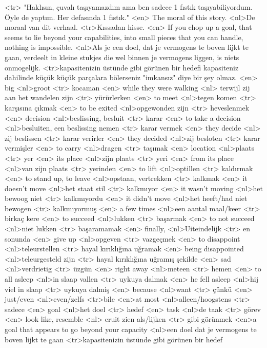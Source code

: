 <tr> "Haklısın, çuvalı taşıyamazdım ama ben sadece 1 fıstık taşıyabiliyordum. Öyle de yaptım. Her defasında 1 fıstık." 
<en> The moral of this story. 
<nl>De moraal van dit verhaal. 
<tr>Kıssadan hisse.
<en> If you chop up a goal, that seems to lie beyond your capabilities, into small pieces that you can handle, nothing is impossible.
<nl>Als je een doel, dat je vermogens te boven lijkt te gaan, verdeelt in kleine stukjes die wel binnen je vermogens liggen, is niets onmogelijk. 
<tr>kapasitenizin üstünde gibi görünen bir hedefi kapasiteniz dahilinde küçük küçük parçalara bölerseniz "imkansız" diye bir şey olmaz. 
<en> big 
<nl>groot 
<tr> kocaman 
<en> while they were walking 
<nl> terwijl zij aan het wandelen zijn 
<tr> yürürlerken
<en> to meet 
<nl>tegen komen 
<tr> karşısına çıkmak 
<en> to be exited 
<nl>opgewonden zijn 
<tr> heveslenmek 
<en> decision 
<nl>beslissing, besluit 
<tr>  karar 
<en> to take a decision 
<nl>besluiten, een beslissing nemen 
<tr> karar vermek 
<en> they decide 
<nl> zij beslissen 
<tr> karar verirler 
<en> they decided
<nl>zij besloten 
<tr> karar vermişler
<en> to carry 
<nl>dragen 
<tr> taşımak
<en> location 
<nl>plaats 
<tr> yer 
<en> its place 
<nl>zijn plaats 
<tr> yeri  
<en> from its place 
<nl>van zijn plaats 
<tr> yerinden 
<en> to lift 
<nl>optillen 
<tr> kaldırmak 
<en>  to stand up, to leave 
<nl>opstaan, vertrekken 
<tr> kalkmak 
<en> it doesn't move 
<nl>het staat stil 
<tr> kalkmıyor 
<en> it wasn't moving 
<nl>het bewoog niet 
<tr> kalkmıyordu   
<en> it didn't move 
<nl>het heeft/had niet bewogen 
<tr>  kalkmıyormuş 
<en> a few times  
<nl>een aantal maal/keer 
<tr> birka\c{c} kere 
<en> to succeed 
<nl>lukken 
<tr> başarmak 
<en> to not succeed 
<nl>niet  lukken 
<tr> başaramamak 
<en> finally, 
<nl>Uiteindelijk 
<tr> en sonunda 
<en> give up 
<nl>opgeven 
<tr> vazgeçmek 
<en> to disappoint 
<nl>teleurstellen 
<tr> hayal kırıklığına uğramak 
<en> being disappointed 
<nl>teleurgesteld zijn 
<tr> hayal kırıklığına uğramış şekilde 
<en> sad 
<nl>verdrietig 
<tr> üzgün
<en> right away 
<nl>meteen 
<tr> hemen 
<en> to all asleep 
<nl>in slaap vallen 
<tr> uykuya dalmak
<en> he fell asleep 
<nl>hij viel in slaap 
<tr> uykuya dalmiş 
<en> because 
<nl>want 
<tr> çünkü  
<en> just/even  
<nl>even/zelfs 
<tr>bile  
<en>at most 
<nl>alleen/hoogstens 
<tr> sadece
<en> goal 
<nl>het  doel 
<tr> hedef 
<en> task 
<nl>de taak 
<tr> görev 
<en> look like, resemble 
<nl> eruit zien als/lijken 
<tr> gibi görünmek 
<en>a goal that appears to go beyond your capacity 
<nl>een doel dat je vermogens te boven lijkt te  gaan 
<tr>kapasitenizin üstünde gibi görünen bir hedef
